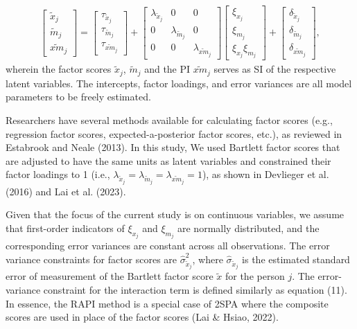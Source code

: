 \documentclass[
  man,mask]{apa6}
\begin{document}
\begin{align}
    \begin{bmatrix}
        \tilde{x}_{j} \\ 
        \tilde{m}_{j} \\
        \widetilde{xm}_{j} 
    \end{bmatrix} = 
    \begin{bmatrix}
        \tau_{\tilde{x}_{j}} \\
        \tau_{\tilde{m}_{j}} \\ 
        \tau_{\widetilde{xm}_{j}}
    \end{bmatrix} + 
    \begin{bmatrix}
        \lambda_{\tilde{x}_{j}} & 0 & 0 \\
        0 & \lambda_{\tilde{m}_{j}} & 0 \\ 
        0 & 0 & \lambda_{\widetilde{xm}_{j}} 
    \end{bmatrix} 
    \begin{bmatrix}
        \xi_{x_{j}} \\  
        \xi_{m_{j}} \\
        \xi_{x_{j}}\xi_{m_{j}}
    \end{bmatrix} +
    \begin{bmatrix}
        \delta_{\tilde{x}_{j}} \\
        \delta_{\tilde{m}_{j}} \\ 
        \delta_{\widetilde{xm}_{j}}
    \end{bmatrix},
\end{align}
wherein the factor scores \(\tilde{x}_{j}\), \(\tilde{m}_{j}\) and the PI \(\widetilde{xm}_{j}\) serves as SI of the respective latent variables. The intercepts, factor loadings, and error variances are all model parameters to be freely estimated.

Researchers have several methods available for calculating factor scores (e.g., regression factor scores, expected-a-posterior factor scores, etc.), as reviewed in Estabrook and Neale (2013). In this study, We used Bartlett factor scores that are adjusted to have the same units as latent variables and constrained their factor loadings to 1 (i.e., \(\lambda_{\tilde{x}_{j}} = \lambda_{\tilde{m}_{j}} = \lambda_{\widetilde{xm}_{j}} = 1\)), as shown in Devlieger et al. (2016) and Lai et al. (2023).

Given that the focus of the current study is on continuous variables, we assume that first-order indicators of \(\xi_{x_{j}}\) and \(\xi_{m_{j}}\) are normally distributed, and the corresponding error variances are constant across all observations. The error variance constraints for factor scores are \(\hat{\sigma}_{\tilde{x}_{j}}^2\), where \(\hat{\sigma}_{\tilde{x}_{j}}\) is the estimated standard error of measurement of the Bartlett factor score \(\tilde{x}\) for the person \(j\). The error-variance constraint for the interaction term is defined similarly as equation (11). In essence, the RAPI method is a special case of 2SPA where the composite scores are used in place of the factor scores (Lai \& Hsiao, 2022).
\end{document}
